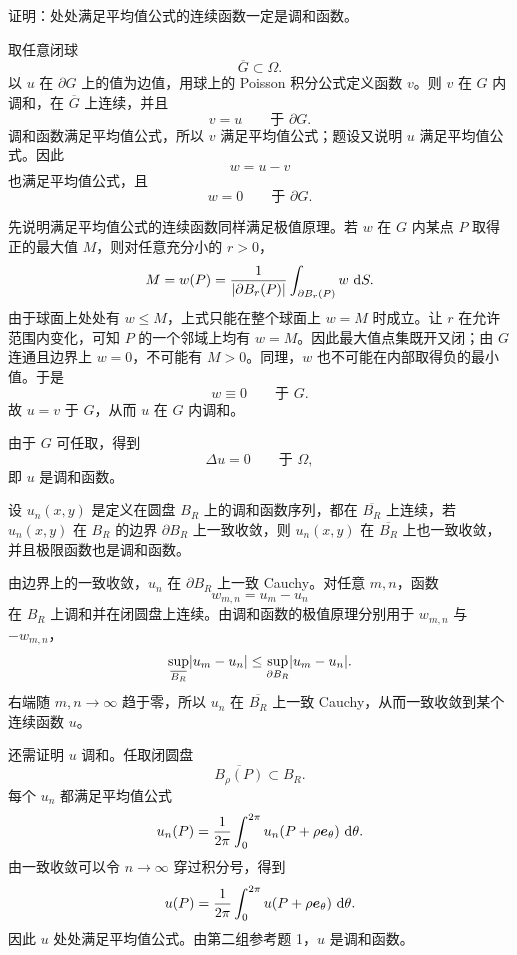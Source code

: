 \begin{xreferenceproblem}[1]
证明：处处满足平均值公式的连续函数一定是调和函数。
\end{xreferenceproblem}
\begin{xsolution}
取任意闭球
\[
  \overline{G}\subset\Omega.
\]
以 $u$ 在 $\partial G$ 上的值为边值，用球上的 Poisson 积分公式定义函数 $v$。则 $v$ 在 $G$ 内调和，在 $\overline G$ 上连续，并且
\[
  v=u\qquad\text{于 }\partial G.
\]
调和函数满足平均值公式，所以 $v$ 满足平均值公式；题设又说明 $u$ 满足平均值公式。因此
\[
  w=u-v
\]
也满足平均值公式，且
\[
  w=0\qquad\text{于 }\partial G.
\]

先说明满足平均值公式的连续函数同样满足极值原理。若 $w$ 在 $G$ 内某点 $P$ 取得正的最大值 $M$，则对任意充分小的 $r>0$，
\[
  M=w(P)=\frac{1}{\lvert\partial B_r(P)\rvert}
  \int_{\partial B_r(P)}w\,\mathop{}\!\mathrm{d} S.
\]
由于球面上处处有 $w\le M$，上式只能在整个球面上 $w=M$ 时成立。让 $r$ 在允许范围内变化，可知 $P$ 的一个邻域上均有 $w=M$。因此最大值点集既开又闭；由 $G$ 连通且边界上 $w=0$，不可能有 $M>0$。同理，$w$ 也不可能在内部取得负的最小值。于是
\[
  w\equiv0\qquad\text{于 }G.
\]
故 $u=v$ 于 $G$，从而 $u$ 在 $G$ 内调和。

由于 $G$ 可任取，得到
\[
  \Delta u=0\qquad\text{于 }\Omega,
\]
即 $u$ 是调和函数。
\end{xsolution}


\begin{xreferenceproblem}[2]
设 $u_n(x,y)$ 是定义在圆盘 $B_R$ 上的调和函数序列，都在 $\overline{B_R}$ 上连续，若 $u_n(x,y)$ 在 $B_R$ 的边界 $\partial B_R$ 上一致收敛，则 $u_n(x,y)$ 在 $\overline{B_R}$ 上也一致收敛，并且极限函数也是调和函数。
\end{xreferenceproblem}
\begin{xsolution}
由边界上的一致收敛，$u_n$ 在 $\partial B_R$ 上一致 Cauchy。对任意 $m,n$，函数
\[
  w_{m,n}=u_m-u_n
\]
在 $B_R$ 上调和并在闭圆盘上连续。由调和函数的极值原理分别用于 $w_{m,n}$ 与 $-w_{m,n}$，
\[
  \sup_{\overline{B_R}}\lvert u_m-u_n\rvert
  \le\sup_{\partial B_R}\lvert u_m-u_n\rvert.
\]
右端随 $m,n\to\infty$ 趋于零，所以 $u_n$ 在 $\overline{B_R}$ 上一致 Cauchy，从而一致收敛到某个连续函数 $u$。

还需证明 $u$ 调和。任取闭圆盘
\[
  \overline{B_\rho(P)}\subset B_R.
\]
每个 $u_n$ 都满足平均值公式
\[
  u_n(P)=\frac{1}{2\pi}\int_0^{2\pi}u_n(P+\rho\bm{e}_\theta)\,\mathop{}\!\mathrm{d}\theta.
\]
由一致收敛可以令 $n\to\infty$ 穿过积分号，得到
\[
  u(P)=\frac{1}{2\pi}\int_0^{2\pi}u(P+\rho\bm{e}_\theta)\,\mathop{}\!\mathrm{d}\theta.
\]
因此 $u$ 处处满足平均值公式。由第二组参考题 1，$u$ 是调和函数。
\end{xsolution}


